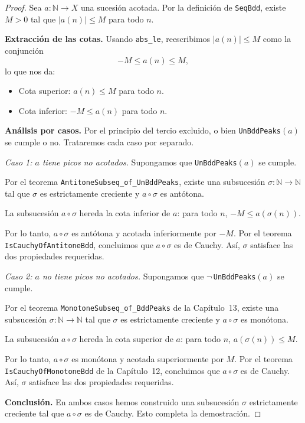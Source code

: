 \begin{proof}
Sea $a : \mathbb{N} \to X$ una sucesión acotada. Por la definición de
\texttt{SeqBdd}, existe $M > 0$ tal que $|a(n)| \leq M$ para todo $n$.

\medskip
\noindent\textbf{Extracción de las cotas.}
Usando \texttt{abs\_le}, reescribimos $|a(n)| \leq M$ como la
conjunción
\[
  -M \leq a(n) \leq M,
\]
lo que nos da:
\begin{itemize}
  \item Cota superior: $a(n) \leq M$ para todo $n$.
  \item Cota inferior: $-M \leq a(n)$ para todo $n$.
\end{itemize}

\medskip
\noindent\textbf{Análisis por casos.}
Por el principio del tercio excluido, o bien \texttt{UnBddPeaks}$(a)$
se cumple o no. Trataremos cada caso por separado.

\medskip
\noindent\textit{Caso 1: $a$ tiene picos no acotados.}
Supongamos que \texttt{UnBddPeaks}$(a)$ se cumple.

Por el teorema \texttt{AntitoneSubseq\_of\_UnBddPeaks}, existe una
subsucesión $\sigma : \mathbb{N} \to \mathbb{N}$ tal que $\sigma$ es
estrictamente creciente y $a \circ \sigma$ es antótona.

La subsucesión $a \circ \sigma$ hereda la cota inferior de $a$: para
todo $n$, $-M \leq a(\sigma(n))$.

Por lo tanto, $a \circ \sigma$ es antótona y acotada inferiormente por
$-M$. Por el teorema \texttt{IsCauchyOfAntitoneBdd}, concluimos que
$a \circ \sigma$ es de Cauchy. Así, $\sigma$ satisface las dos
propiedades requeridas.

\medskip
\noindent\textit{Caso 2: $a$ no tiene picos no acotados.}
Supongamos que $\neg$\,\texttt{UnBddPeaks}$(a)$ se cumple.

Por el teorema \texttt{MonotoneSubseq\_of\_BddPeaks} de la
Capítulo~13, existe una subsucesión $\sigma : \mathbb{N} \to
\mathbb{N}$ tal que $\sigma$ es estrictamente creciente y $a \circ
\sigma$ es monótona.

La subsucesión $a \circ \sigma$ hereda la cota superior de $a$: para
todo $n$, $a(\sigma(n)) \leq M$.

Por lo tanto, $a \circ \sigma$ es monótona y acotada superiormente por
$M$. Por el teorema \texttt{IsCauchyOfMonotoneBdd} de la
Capítulo~12, concluimos que $a \circ \sigma$ es de Cauchy. Así,
$\sigma$ satisface las dos propiedades requeridas.

\medskip
\noindent\textbf{Conclusión.}
En ambos casos hemos construido una subsucesión $\sigma$ estrictamente
creciente tal que $a \circ \sigma$ es de Cauchy. Esto completa la
demostración.
\end{proof}

